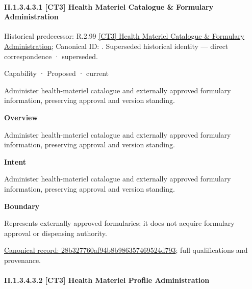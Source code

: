 \paragraph*{II.1.3.4.3.1 [CT3] Health Materiel Catalogue \& Formulary Administration}
\label{navigation:II.1.3.4.3.1}

{\small Historical predecessor: R.2.99 \hyperref[element:5c691959e2cc4a289fc25b9f3497eed9]{[CT3] Health Materiel Catalogue \& Formulary Administration}; Canonical ID: \texttt{}. Superseded historical identity — direct correspondence · superseded.}\par
\label{element:28b327760af94b8b986357469524d793}
{\small Capability · Proposed · current}\par

Administer health-materiel catalogue and externally approved formulary information, preserving approval and version standing.



\textbf{Overview}



Administer health-materiel catalogue and externally approved formulary information, preserving approval and version standing.



\textbf{Intent}



Administer health-materiel catalogue and externally approved formulary information, preserving approval and version standing.



\textbf{Boundary}



Represents externally approved formularies; it does not acquire formulary approval or dispensing authority.


{\footnotesize \href{../../../../../../../continuum/strategy/capability/28b327760af94b8b986357469524d793.md}{Canonical record: 28b327760af94b8b986357469524d793}; full qualifications and provenance.}\par
\paragraph*{II.1.3.4.3.2 [CT3] Health Materiel Profile Administration}
\label{navigation:II.1.3.4.3.2}

